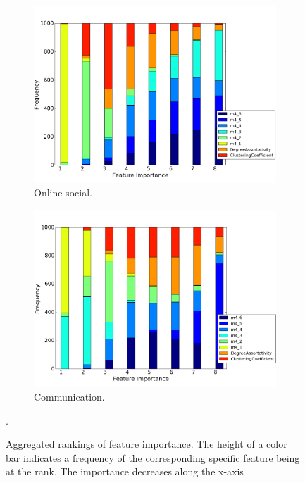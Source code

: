\documentclass[..]{revtex4}
\begin{document}
\begin{figure}[H]
\medskip
\begin{subfigure}{0.48\textwidth}
\includegraphics[width=\linewidth]{figs/one_by_many/online_social/feature_importance.png}
\caption{Online social.} \label{online_social_feature}
\end{subfigure}\hspace*{\fill}
\begin{subfigure}{0.48\textwidth}
\includegraphics[width=\linewidth]{figs/one_by_many/communication/feature_importance.png}
\caption{Communication.} \label{communication_feature}
\end{subfigure}

\caption{Aggregated rankings of feature importance. The height of a color bar indicates a frequency of the corresponding specific feature being at the rank. The importance decreases along the x-axis} \label{feature_importance_figures}.
\end{figure}
\end{document}
